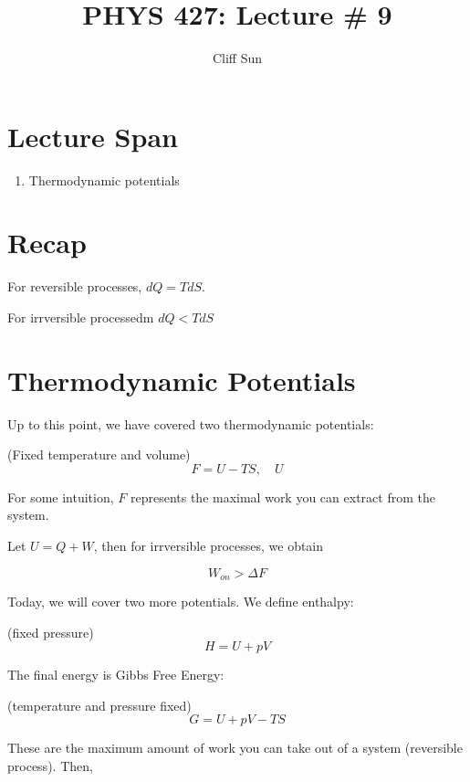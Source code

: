 \documentclass{article}
\title{PHYS 427: Lecture \# 9}
\author{Cliff Sun}
\newtheorem{one minute paper}[theorem]{One Minute Paper}
\begin{document}
\maketitle

\section*{Lecture Span}
\begin{enumerate}
    \item Thermodynamic potentials
\end{enumerate}

\section*{Recap}

For reversible processes, $dQ = TdS$. 

For irrversible processedm $dQ < TdS$

\section*{Thermodynamic Potentials}

Up to this point, we have covered two thermodynamic potentials:

(Fixed temperature and volume)
\begin{equation}
    F = U - TS, \quad U
\end{equation}

For some intuition, $F$ represents the maximal work you can extract from the system.   

Let $U = Q + W$, then for irrversible processes, we obtain 

\begin{equation}
    W_{on} > \Delta F
\end{equation}

Today, we will cover two more potentials. We define enthalpy:

(fixed pressure)
\begin{equation}
    H = U + pV
\end{equation}

The final energy is Gibbs Free Energy:

(temperature and pressure fixed)
\begin{equation}
    G = U + pV - TS
\end{equation}

These are the maximum amount of work you can take out of a system (reversible process). Then, 
\end{document}
